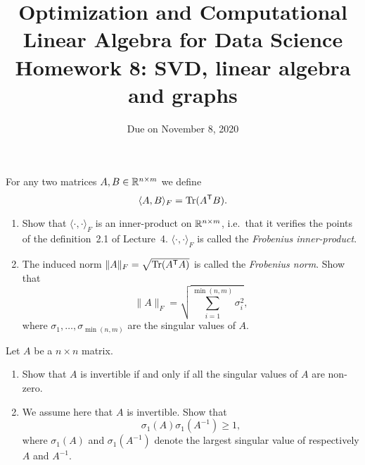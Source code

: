 \documentclass[11pt,nocut]{article}
\title{\vspace{-2.0cm}%
	Optimization and Computational Linear Algebra for Data Science\\
Homework 8: SVD, linear algebra and graphs}
\date{\vspace{-1cm}Due on November 8, 2020}
\begin{document}
\maketitle




\begin{problem}[2 points]
	For any two matrices $A,B \in \mathbb{R}^{n\times m}$ we define
	$$
	\langle A,B \rangle_{F} = {{\rm Tr}}(A^{{\sf T}} B).
	$$
	\begin{enumerate}[label=\normalfont(\textbf{\alph*})]
	\item Show that $\langle \cdot, \cdot \rangle_F$ is an inner-product on $\mathbb{R}^{n \times m}$, i.e.\ that it verifies the points of the definition~2.1 of Lecture~4. $\langle \cdot, \cdot \rangle_F$ is called the \emph{Frobenius inner-product}.
		\item The induced norm $\|A\|_F = \sqrt{{{\rm Tr}}(A^{{\sf T}} A)}$ is called the \emph{Frobenius norm}.
			Show that
			$$
			\|A\|_F = \sqrt{\sum_{i=1}^{\min(n,m)} \sigma_i^2},
			$$
			where $\sigma_1, \dots, \sigma_{\min(n,m)}$ are the singular values of $A$.
	\end{enumerate}
\end{problem}

\vspace{1mm}

\begin{problem}[2 points]
	Let $A$ be a $n \times n$ matrix.
	\begin{enumerate}[label=\normalfont(\textbf{\alph*})]
		\item Show that $A$ is invertible if and only if all the singular values of $A$ are non-zero.
		\item We assume here that $A$ is invertible. Show that 
				$$
				\sigma_1(A) \sigma_1(A^{-1}) \geq 1,
				$$
				where $\sigma_1(A)$ and $\sigma_1(A^{-1})$ denote the largest singular value of respectively $A$ and $A^{-1}$.
	\end{enumerate}
\end{problem}

\vspace{1mm}
\end{document}
